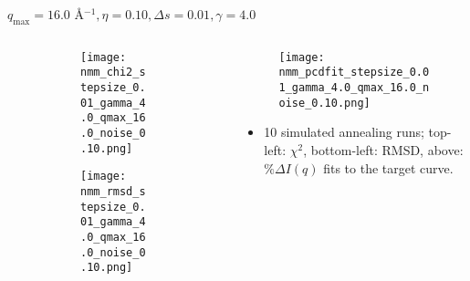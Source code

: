 \documentclass{beamer}
\begin{document}
\begin{frame}{$ q_{\textrm{max}}=16.0 $ \AA $^{-1}, \eta=0.10, \Delta s=0.01, \gamma=4.0$}
	\begin{columns}
		\begin{column}{.5\textwidth}
			\begin{figure}[H]
			\centering
			\begin{subfigure}[b]{\textwidth}
				\centering
				\texttt{[image: nmm\_chi2\_stepsize\_0.01\_gamma\_4.0\_qmax\_16.0\_noise\_0.10.png]}
				\label{fig:}
			\end{subfigure}
			\begin{subfigure}[b]{\textwidth}
				\centering
				\texttt{[image: nmm\_rmsd\_stepsize\_0.01\_gamma\_4.0\_qmax\_16.0\_noise\_0.10.png]}
				\label{fig:}
			\end{subfigure}
			\end{figure}
		\end{column}
		\begin{column}{.5\textwidth}
			\begin{figure}[H]
				\centering
				\texttt{[image: nmm\_pcdfit\_stepsize\_0.01\_gamma\_4.0\_qmax\_16.0\_noise\_0.10.png]}
				\label{fig:}
			\end{figure}
			\begin{itemize}
				\item 10 simulated annealing runs; top-left: $\chi^2$, bottom-left: RMSD, above: $\%\Delta I(q)$ fits to the target curve.
			\end{itemize}
		\end{column}
	\end{columns}
\end{frame}
 
\end{document}
